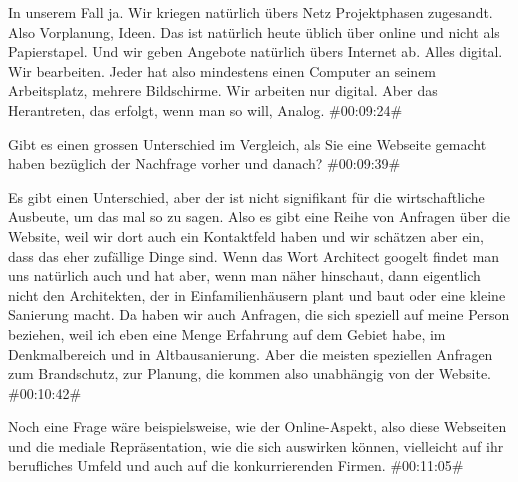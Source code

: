 \begin{description}
\Andre In unserem Fall ja. Wir kriegen natürlich übers Netz Projektphasen zugesandt. Also Vorplanung, Ideen. Das ist natürlich heute üblich über online und nicht als Papierstapel. Und wir geben Angebote natürlich übers Internet ab. Alles digital. Wir bearbeiten. Jeder hat also mindestens einen Computer an seinem Arbeitsplatz, mehrere Bildschirme. Wir arbeiten nur digital. Aber das Herantreten, das erfolgt, wenn man so will, Analog. \#00:09:24\#

\Toni Gibt es einen grossen Unterschied im Vergleich, als Sie eine Webseite gemacht haben bezüglich der Nachfrage vorher und danach? \#00:09:39\#

\Andre Es gibt einen Unterschied, aber der ist nicht signifikant für die wirtschaftliche Ausbeute, um das mal so zu sagen. Also es gibt eine Reihe von Anfragen über die Website, weil wir dort auch ein Kontaktfeld haben und wir schätzen aber ein, dass das eher zufällige Dinge sind. Wenn das Wort Architect googelt findet man uns natürlich auch und hat aber, wenn man näher hinschaut, dann eigentlich nicht den Architekten, der in Einfamilienhäusern plant und baut oder eine kleine Sanierung macht. Da haben wir auch Anfragen, die sich speziell auf meine Person beziehen, weil ich eben eine Menge Erfahrung auf dem Gebiet habe, im Denkmalbereich und in Altbausanierung. Aber die meisten speziellen Anfragen zum Brandschutz, zur Planung, die kommen also unabhängig von der Website. \#00:10:42\#

\Toni Noch eine Frage wäre beispielsweise, wie der Online-Aspekt, also diese Webseiten und die mediale Repräsentation, wie die sich auswirken können, vielleicht auf ihr berufliches Umfeld und auch auf die konkurrierenden Firmen. \#00:11:05\#


\end{description}
